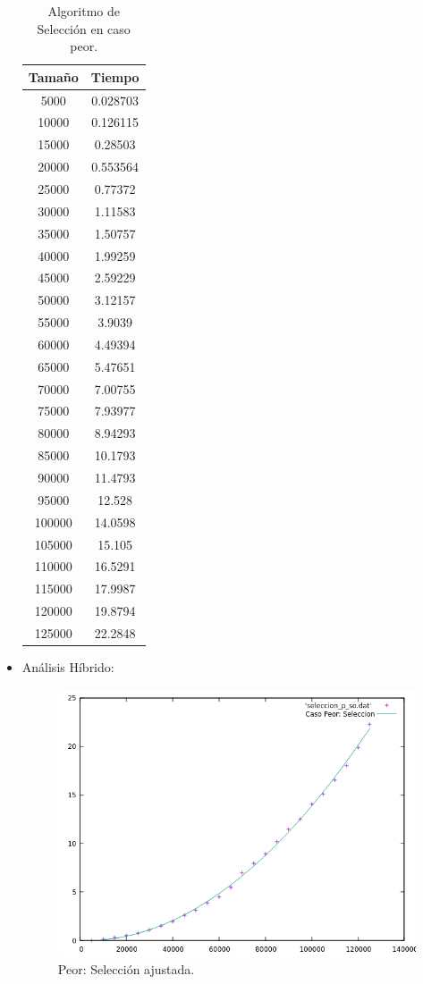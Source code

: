 \documentclass[a4paper,12pt,twoside]{article} %
\begin{document}
\begin{itemize}
		\begin{table}[h]
	\begin{center}
		\begin{tabular}{|c|c|}
		\hline
		Tamaño & Tiempo \\
		\hline
		5000 & 0.028703 \\
		10000 & 0.126115 \\
		15000 & 0.28503 \\
		20000 & 0.553564 \\
		25000 & 0.77372 \\
		30000 & 1.11583 \\
		35000 & 1.50757 \\
		40000 & 1.99259 \\
		45000 & 2.59229 \\
		50000 & 3.12157 \\
		55000 & 3.9039 \\
		60000 & 4.49394 \\
		65000 & 5.47651 \\
		70000 & 7.00755 \\
		75000 & 7.93977 \\
		80000 & 8.94293 \\
		85000 & 10.1793 \\
		90000 & 11.4793 \\
		95000 & 12.528 \\
		100000 & 14.0598 \\
		105000 & 15.105 \\
		110000 & 16.5291 \\
		115000 & 17.9987 \\
		120000 & 19.8794 \\
		125000 & 22.2848 \\
		\hline
		\end{tabular}
	\end{center}
	\caption{Algoritmo de Selección en caso peor.}
\end{table}
\newpage
		\item Análisis Híbrido:
\begin{figure}[h]
  \begin{center}
  
  	\includegraphics[scale=0.8]{seleccion_p_so_a.png}
  	\caption{Peor: Selección ajustada.}
  	

\end{center}
\end{figure}
\end{itemize}
\end{document}
